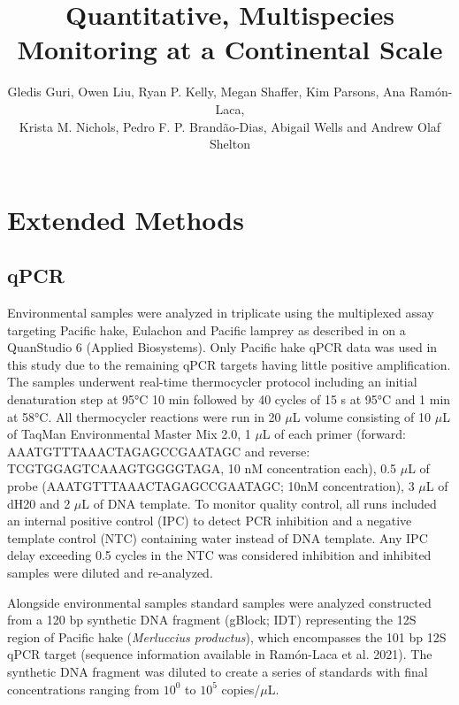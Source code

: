 \documentclass[9pt,twoside,lineno]{pnas-SI}
\title{Quantitative, Multispecies Monitoring at a Continental Scale}
\author{Gledis Guri, Owen Liu, Ryan P. Kelly, Megan Shaffer, Kim Parsons, Ana Ram\'on-Laca,\\
Krista M. Nichols, Pedro F. P. Brandão-Dias, Abigail Wells and Andrew Olaf Shelton}
\begin{document}
\maketitle

\SItext

\section*{Extended Methods}
\subsection*{qPCR}
Environmental samples were analyzed in triplicate using the multiplexed assay targeting Pacific hake, Eulachon and Pacific lamprey as described in \cite{ramon-laca2021} on a QuanStudio 6 (Applied Biosystems). Only Pacific hake qPCR data was used in this study due to the remaining qPCR targets having little positive amplification. The samples underwent real-time thermocycler protocol including an initial denaturation step at 95°C 10 min followed by 40 cycles of 15 s at 95°C and 1 min at 58°C. All thermocycler reactions were run in 20 $\mu$L volume consisting of 10 $\mu$L of TaqMan Environmental Master Mix 2.0, 1 $\mu$L of each primer (forward: AAATGTTTAAACTAGAGCCGAATAGC and reverse: TCGTGGAGTCAAAGTGGGGTAGA, 10 nM concentration each), 0.5 $\mu$L of probe (AAATGTTTAAACTAGAGCCGAATAGC; 10nM concentration), 3 $\mu$L of dH20 and 2 $\mu$L of DNA template. To monitor quality control, all runs included an internal positive control (IPC) to detect PCR inhibition and a negative template control (NTC) containing water instead of DNA template. Any IPC delay exceeding 0.5 cycles in the NTC was considered inhibition and inhibited samples were diluted and re-analyzed.

Alongside environmental samples standard samples were analyzed constructed from a 120 bp synthetic DNA fragment (gBlock; IDT) representing the 12S region of Pacific hake (\textit{Merluccius productus}), which encompasses the 101 bp 12S qPCR target (sequence information available in Ramón-Laca et al. 2021). The synthetic DNA fragment was diluted to create a series of standards with final concentrations ranging from $10^{0}$ to $10^{5}$ copies/$\mu$L.
\end{document}
